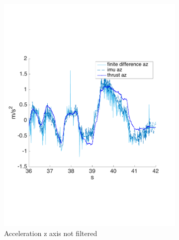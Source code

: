 \begin{figure}[!htbp]
    \begin{subfigure}[b]{0.45\textwidth}
     \includegraphics[width=\textwidth]{img/acceleration_mass_changed_no_filter_z.pdf}
        \caption{Acceleration z axis  not filtered}
        \label{fig:comparison_accz}
   \end{subfigure}
     \begin{subfigure}[b]{0.45\textwidth}

\end{subfigure}
\end{figure}
